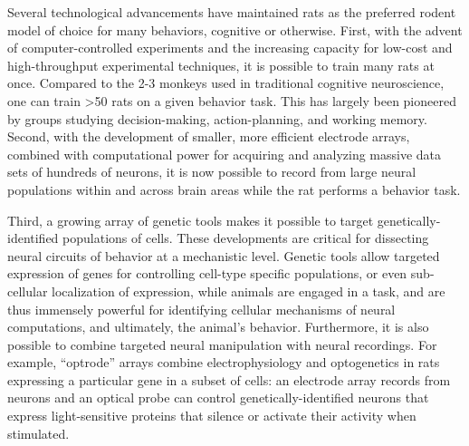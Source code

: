 Several technological advancements have maintained rats as the preferred rodent model of choice for many behaviors, cognitive or otherwise. First, with the advent of computer-controlled experiments and the increasing capacity for low-cost and high-throughput experimental techniques, it is possible to train many rats at once. Compared to the 2-3 monkeys used in traditional cognitive neuroscience, one can train >50 rats on a given behavior task\cite{Brunton2013, Constantinople2019}. This has largely been pioneered by groups studying decision-making, action-planning, and working memory\cite{Raposo2012,Brunton2013,Miller2017TwoStep,Piet2018,Akrami2018, Constantinople2019}. Second, with the development of smaller, more efficient electrode arrays, combined with computational power for acquiring and analyzing massive data sets of hundreds of neurons\cite{Pachitariu2016, Steinmetz2018,Stringer2019}, it is now possible to record from large neural populations within and across brain areas while the rat performs a behavior task.

Third, a growing array of genetic tools makes it possible to target genetically-identified populations of cells\cite{Tomita2009,Witten2011,Igarashi2018}. These developments are critical for dissecting neural circuits of behavior at a mechanistic level. Genetic tools allow targeted expression of genes for controlling cell-type specific populations, or even sub-cellular localization of expression, while animals are engaged in a task, and are thus immensely powerful for identifying cellular mechanisms of neural computations, and ultimately, the animal's behavior. Furthermore, it is also possible to combine targeted neural manipulation with neural recordings. For example, ``optrode'' arrays combine electrophysiology and optogenetics in rats expressing a particular gene in a subset of cells:  an electrode array records from neurons and an optical probe can control genetically-identified neurons that express light-sensitive proteins that silence or activate their activity when stimulated\cite{Gradinaru2007,Yang2018}.


